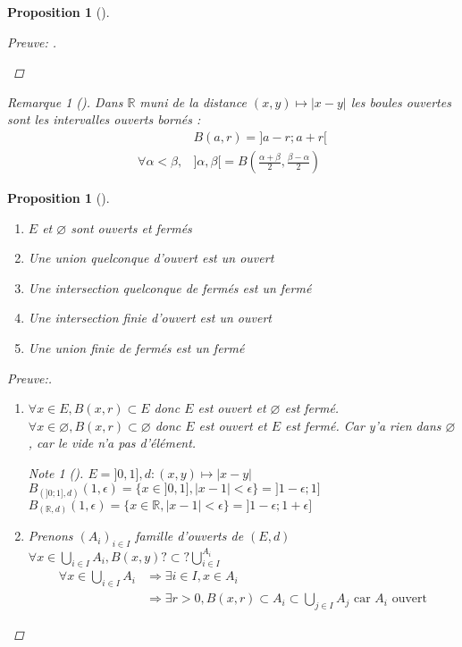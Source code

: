 \documentclass{article}
\theoremstyle{plain}%
\newtheorem{prop}[thm]{Proposition}
\theoremstyle{definition}
\theoremstyle{remark}
\newtheorem*{rem}{Remarque}
\newtheorem*{note}{Note}
\begin{document}
\begin{prop}[]
\begin{proof}[Preuve: ]
\begin{enumerate}
        \end{enumerate}
    \end{proof}
    \begin{rem}[]
        Dans $ \mathbb{R} $ muni de la distance $ (x,y) \mapsto \left| x-y \right|  $ les boules ouvertes sont les intervalles ouverts bornés : 
        \begin{align*}
            & B(a,r) = ]a-r;a+r[ \\
            \forall \alpha < \beta, & ]\alpha , \beta [ = B(\frac{\alpha + \beta }{2}, \frac{\beta - \alpha }{2})
        \end{align*}
    \end{rem}
\end{prop}

\begin{prop}[]
    \begin{enumerate}
        \item $ E $ et $ \varnothing  $ sont ouverts et fermés
        \item Une union quelconque d'ouvert est un ouvert 
        \item Une intersection quelconque de fermés est un fermé
        \item Une intersection finie d'ouvert est un ouvert 
        \item Une union finie de fermés est un fermé
    \end{enumerate}
    \begin{proof}[Preuve:]
        \begin{enumerate}
            \item $ \forall x \in E, B(x,r) \subset E $  donc $ E $ est ouvert et $ \varnothing  $ est fermé. \\
            $ \forall x \in \varnothing, B(x,r) \subset \varnothing  $  donc $ E $ est ouvert et $ E $ est fermé. Car y'a rien dans $ \varnothing  $, car le vide n'a pas d'élément.
            \begin{note}[]
                $ E = ]0,1], d:(x,y) \mapsto \left| x-y \right|  $ \\
                $ B_{(]0;1], d)} (1, \epsilon ) = \{x \in ]0,1], \left| x-1 \right| < \epsilon \} = ]1-\epsilon ;1]$ 
                $ B_{(\mathbb{R}, d)} (1, \epsilon ) = \{x \in \mathbb{R}, \left| x-1 \right| < \epsilon \} = ]1-\epsilon ;1+\epsilon ]$ 
            \end{note}
    
            \item Prenons $ (A_i)_{i \in I} $ famille d'ouverts de $ (E,d) $\\
            $ \forall x \in \bigcup_{i \in I}^{}A_i, B(x,y) ?\subset?\bigcup_{i \in I}^{A_i}$ 
            \begin{align*}
                \forall x \in \bigcup_{i \in I}^{}A_i &\Rightarrow  \exists i \in I, x \in A_i \\
                & \Rightarrow \exists r > 0, B(x,r) \subset A_i \subset \bigcup_{j \in I}^{}A_j \text{ car } A_i \text{ ouvert}
            \end{align*}
    

\end{enumerate}
\end{proof}
\end{prop}
\end{document}
